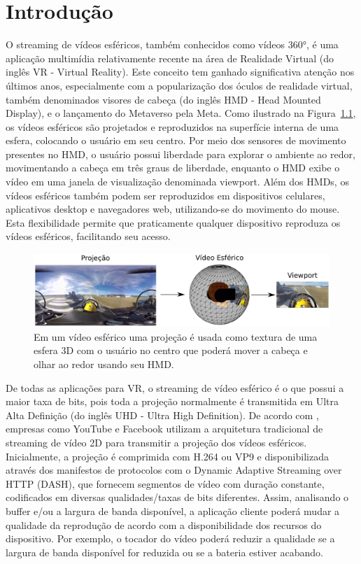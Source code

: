 \chapter{Introdução}\label{Cap:Introduction}


O streaming de vídeos esféricos, também conhecidos como vídeos 360°, é uma aplicação multimídia relativamente recente na área de Realidade Virtual (do inglês VR - Virtual Reality). Este conceito tem ganhado significativa atenção nos últimos anos, especialmente com a popularização dos óculos de realidade virtual, também denominados visores de cabeça (do inglês HMD - Head Mounted Display), e o lançamento do Metaverso pela Meta. Como ilustrado na Figura~\ref{fig:video360}, os vídeos esféricos são projetados e reproduzidos na superfície interna de uma esfera, colocando o usuário em seu centro. Por meio dos sensores de movimento presentes no HMD, o usuário possui liberdade para explorar o ambiente ao redor, movimentando a cabeça em três graus de liberdade, enquanto o HMD exibe o vídeo em uma janela de visualização denominada viewport. Além dos HMDs, os vídeos esféricos também podem ser reproduzidos em dispositivos celulares, aplicativos desktop e navegadores web, utilizando-se do movimento do mouse. Esta flexibilidade permite que praticamente qualquer dispositivo reproduza os vídeos esféricos, facilitando seu acesso.

\begin{figure}[h]
	\centering
	\includegraphics[width=0.8\columnwidth]{fig/viewport.pdf}
	\caption{Em um vídeo esférico uma projeção é usada como textura de uma esfera 3D com o usuário no centro que poderá mover a cabeça e olhar ao redor usando seu HMD.}
	\label{fig:video360}
\end{figure}

De todas as aplicações para VR, o streaming de vídeo esférico é o que possui a maior taxa de bits, pois toda a projeção normalmente é transmitida em Ultra Alta Definição (do inglês UHD - Ultra High Definition). De acordo com \cite{Zhou2017, Liu2017}, empresas como YouTube e Facebook utilizam a arquitetura tradicional de streaming de vídeo 2D para transmitir a projeção dos vídeos esféricos. Inicialmente, a projeção é comprimida com H.264 ou VP9 e disponibilizada através dos manifestos de protocolos com o Dynamic Adaptive Streaming over HTTP (DASH), que fornecem segmentos de vídeo com duração constante, codificados em diversas qualidades/taxas de bits diferentes. Assim, analisando o buffer e/ou a largura de banda disponível, a aplicação cliente poderá mudar a qualidade da reprodução de acordo com a disponibilidade dos recursos do dispositivo. Por exemplo, o tocador do vídeo poderá reduzir a qualidade se a largura de banda disponível for reduzida ou se a bateria estiver acabando.

